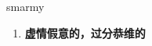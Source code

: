 
\begin{frame}
{\huge smarmy}
\begin{center}
\begin{enumerate}\Large
  \item \textbf{虚情假意的，过分恭维的}
\end{enumerate}
\end{center}
\end{frame}
